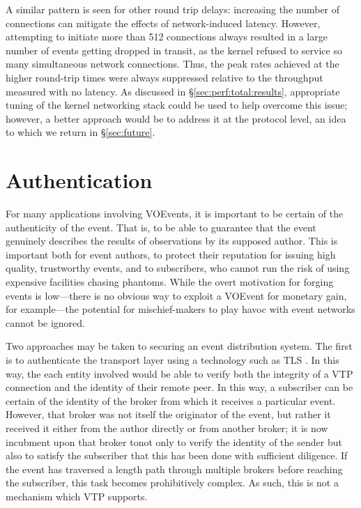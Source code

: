 \documentclass[5p,authoryear]{elsarticle}
\begin{document}
A similar pattern is seen for other round trip delays: increasing the number
of connections can mitigate the effects of network-induced latency. However,
attempting to initiate more than 512 connections always resulted in a large
number of events getting dropped in transit, as the kernel refused to service
so many simultaneous network connections. Thus, the peak rates achieved at the
higher round-trip times were always suppressed relative to the throughput
measured with no latency. As discussed in \S\ref{sec:perf:total:results},
appropriate tuning of the kernel networking stack could be used to help
overcome this issue; however, a better approach would be to address it at the
protocol level, an idea to which we return in \S\ref{sec:future}.

\section{Authentication}
\label{sec:security}

For many applications involving VOEvents, it is important to be certain of the
authenticity of the event. That is, to be able to guarantee that the event
genuinely describes the results of observations by its supposed author. This
is important both for event authors, to protect their reputation for issuing
high quality, trustworthy events, and to subscribers, who cannot run the risk
of using expensive facilities chasing phantoms. While the overt motivation for
forging events is low---there is no obvious way to exploit a VOEvent for
monetary gain, for example---the potential for mischief-makers to play havoc
with event networks cannot be ignored.

Two approaches may be taken to securing an event distribution system. The
first is to authenticate the transport layer using a technology such as TLS
\citep{Dierks:2008}. In this way, the each entity involved would be able to
verify both the integrity of a VTP connection and the identity of their remote
peer. In this way, a subscriber can be certain of the identity of the broker
from which it receives a particular event. However, that broker was not itself
the originator of the event, but rather it received it either from the author
directly or from another broker; it is now incubment upon that broker tonot
only to verify the identity of the sender but also to satisfy the subscriber
that this has been done with sufficient diligence. If the event has traversed
a length path through multiple brokers before reaching the subscriber, this
task becomes prohibitively complex. As such, this is not a mechanism which VTP
supports.
\end{document}
